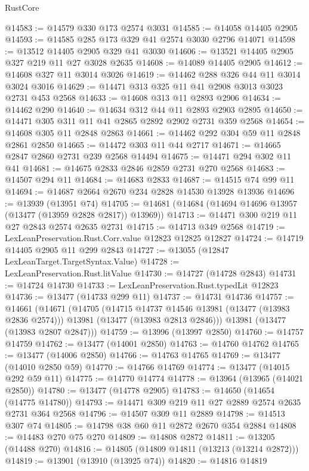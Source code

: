 \begin{lexlean}{RustCore}
\begin{coremodule}
@14583 := @14579 @330 @173 @2574 @3031
@14585 := @14058 @14405 @2905
@14593 := @14585 @285 @173 @329 @41 @2574 @3030 @2796 @14071
@14598 := @13512 @14405 @2905 @329 @41 @3030
@14606 := @13521 @14405 @2905 @327 @219 @11 @27 @3028 @2635
@14608 := @14089 @14405 @2905
@14612 := @14608 @327 @11 @3014 @3026
@14619 := @14462 @288 @326 @44 @11 @3014 @3024 @3016
@14629 := @14471 @313 @325 @11 @41 @2908 @3013 @3023 @2731 @453 @2568
@14633 := @14608 @313 @11 @2893 @2906
@14634 := @14462 @290
@14640 := @14634 @312 @44 @11 @2893 @2903 @2895
@14650 := @14471 @305 @311 @11 @41 @2865 @2892 @2902 @2731 @359 @2568
@14654 := @14608 @305 @11 @2848 @2863
@14661 := @14462 @292 @304 @59 @11 @2848 @2861 @2850
@14665 := @14472 @303 @11 @44 @2717
@14671 := @14665 @2847 @2860 @2731 @239 @2568 @14494
@14675 := @14471 @294 @302 @11 @41
@14681 := @14675 @2833 @2846 @2859 @2731 @270 @2568
@14683 := @14507 @294 @11
@14684 := @14683 @2833
@14687 := @14515 @74 @99 @11
@14694 := @14687 @2664 @2670 @234 @2828 @14530 @13928 @13936
@14696 := @13939 (@13951 @74)
@14705 := @14681 (@14684 (@14694 @14696 @13957 (@13477 (@13959 @2828 @2817)) @13969))
@14713 := @14471 @300 @219 @11 @27 @2843 @2574 @2635 @2731
@14715 := @14713 @349 @2568
@14719 := LexLeanPreservation.Rust.Corr.value @12823 @12825 @12827
@14724 := @14719 @14405 @2905 @11 @299 @2843
@14727 := @13055 (@12847 LexLeanTarget.TargetSyntax.Value)
@14728 := LexLeanPreservation.Rust.litValue
@14730 := @14727 (@14728 @2843)
@14731 := @14724 @14730
@14733 := LexLeanPreservation.Rust.typedLit @12823
@14736 := @13477 (@14733 @299 @11)
@14737 := @14731 @14736
@14757 := @14661
    (@14671
      (@14705
        (@14715 @14737 @14546 @13981 (@13477 (@13983 @2836 @2574)))
        @13981
        (@13477 (@13983 @2813 @2846)))
      @13981
      (@13477 (@13983 @2807 @2847)))
@14759 := @13996 (@13997 @2850)
@14760 := @14757 @14759
@14762 := @13477 (@14001 @2850)
@14763 := @14760 @14762
@14765 := @13477 (@14006 @2850)
@14766 := @14763 @14765
@14769 := @13477 (@14010 @2850 @59)
@14770 := @14766 @14769
@14774 := @13477 (@14015 @292 @59 @11)
@14775 := @14770 @14774
@14778 := @13964 (@13965 (@14021 @2850))
@14780 := @13477 (@14778 @2905)
@14783 := @14650 (@14654 (@14775 @14780))
@14793 := @14471 @309 @219 @11 @27 @2889 @2574 @2635 @2731 @364 @2568
@14796 := @14507 @309 @11 @2889
@14798 := @14513 @307 @74
@14805 := @14798 @38 @60 @11 @2872 @2670 @354 @2884
@14808 := @14483 @270 @75 @270
@14809 := @14808 @2872
@14811 := @13205 (@14488 @270)
@14816 := @14805 (@14809 @14811 (@13213 (@13214 @2872)))
@14819 := @13901 (@13910 (@13925 @74))
@14820 := @14816 @14819

\end{coremodule}
\end{lexlean}
